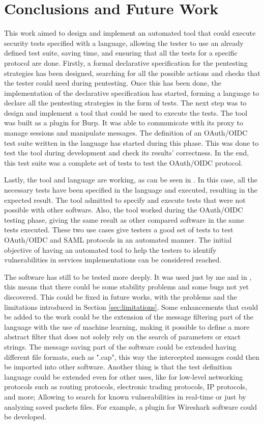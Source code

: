 \chapter{Conclusions and Future Work}
\label{chap:Conclusions}
This work aimed to design and implement an automated tool that could execute security tests specified with a language, allowing the tester to use an already defined test suite, saving time, and ensuring that all the tests for a specific protocol are done. Firstly, a formal declarative specification for the pentesting strategies has been designed, searching for all the possible actions and checks that the tester could need during pentesting. Once this has been done, the implementation of the declarative specification has started, forming a language to declare all the pentesting strategies in the form of tests. The next step was to design and implement a tool that could be used to execute the tests. The tool was built as a plugin for Burp. It was able to communicate with its proxy to manage sessions and manipulate messages. The definition of an OAuth/OIDC test suite written in the language has started during this phase. This was done to test the tool during development and check its results' correctness. In the end, this test suite was a complete set of tests to test the OAuth/OIDC protocol.

Lastly, the tool and language are working, as can be seen in \cite{sofia_zanrosso}. In this case, all the necessary tests have been specified in the language and executed, resulting in the expected result. The tool admitted to specify and execute tests that were not possible with other software. Also, the tool worked during the OAuth/OIDC testing phase, giving the same result as other compared software in the same tests executed. These two use cases give testers a good set of tests to test OAuth/OIDC and SAML protocols in an automated manner. The initial objective of having an automated tool to help the testers to identify vulnerabilities in services implementations can be considered reached. 

The software has still to be tested more deeply. It was used just by me and in \cite{sofia_zanrosso}, this means that there could be some stability problems and some bugs not yet discovered. This could be fixed in future works, with the problems and the limitations introduced in Section \ref{sec:limitations}. Some enhancements that could be added to the work could be the extension of the message filtering part of the language with the use of machine learning, making it possible to define a more abstract filter that does not solely rely on the search of parameters or exact strings. The message saving part of the software could be extended having different file formats, such as ".cap", this way the intercepted messages could then be imported into other software.
Another thing is that the test definition language could be extended even for other uses, like for low-level networking protocols such as routing protocols, electronic trading protocols, IP protocols, and more; Allowing to search for known vulnerabilities in real-time or just by analyzing saved packets files. For example, a plugin for Wireshark software could be developed. 




